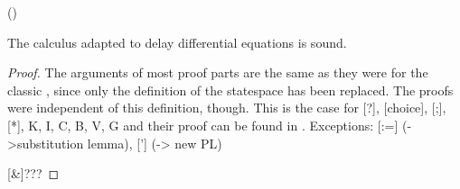\documentclass[10pt]{report}
\begin{document}
\begin{calculus}
{{            }{
                (\asfml\limply\dbox{\hrepeat{\asprg}}{\asfml})
            }
        }{}
        \cinferenceRule[Vb|V]{}{
            \linferenceRule[impl]{
                \asfml
            }{
                \dbox{\asprg}{\asfml}
            }
        }{$\freevars{\asfml}\cap\boundvars{\asprg}=\emptyset$}


    \end{calculus}

    \begin{theorem}[Soundness of \dL]
        \label{thm:dL-soundness}
        The \dL calculus adapted to delay differential equations is sound.

    \end{theorem}
    \begin{proof}
        The arguments of most proof parts are the same as they were for the classic \dL, since only the definition of the statespace has been replaced. The proofs were independent of this definition, though. This is the case for [?], [choice], [;], [*], K, I, C, B, V, G and their proof can be found in \cite{platzer2012complete}.
        Exceptions: [:=] (->substitution lemma), ['] (-> new PL)

        [\&]???
    \end{proof}
\end{document}
